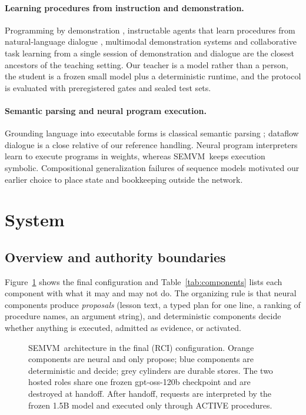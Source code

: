 \documentclass[10pt]{article}
\newcommand{\semvm}{SEMVM}
\begin{document}
\paragraph{Learning procedures from instruction and demonstration.} Programming by demonstration \citep{cypher1993watch}, instructable agents that learn procedures from natural-language dialogue \citep{azaria2016lia}, multimodal demonstration systems \citep{li2017sugilite} and collaborative task learning from a single session of demonstration and dialogue \citep{allen2007plow} are the closest ancestors of the teaching setting. Our teacher is a model rather than a person, the student is a frozen small model plus a deterministic runtime, and the protocol is evaluated with preregistered gates and sealed test sets.

\paragraph{Semantic parsing and neural program execution.} Grounding language into executable forms is classical semantic parsing \citep{zettlemoyer2005learning, liang2011dcs}; dataflow dialogue \citep{andreas2020dataflow} is a close relative of our reference handling. Neural program interpreters \citep{reed2016npi} learn to execute programs in weights, whereas \semvm\ keeps execution symbolic. Compositional generalization failures of sequence models \citep{lake2018scan} motivated our earlier choice to place state and bookkeeping outside the network.

\section{System}\label{sec:system}

\subsection{Overview and authority boundaries}

Figure~\ref{fig:arch} shows the final configuration and Table~\ref{tab:components} lists each component with what it may and may not do. The organizing rule is that neural components produce \emph{proposals} (lesson text, a typed plan for one line, a ranking of procedure names, an argument string), and deterministic components decide whether anything is executed, admitted as evidence, or activated.

\begin{figure}[t]
\centering
\resizebox{\linewidth}{!}{}
\caption{\semvm\ architecture in the final (RCI) configuration. Orange components are neural and only propose; blue components are deterministic and decide; grey cylinders are durable stores. The two hosted roles share one frozen gpt-oss-120b checkpoint and are destroyed at handoff. After handoff, requests are interpreted by the frozen 1.5B model and executed only through ACTIVE procedures.}
\label{fig:arch}
\end{figure}
\end{document}
